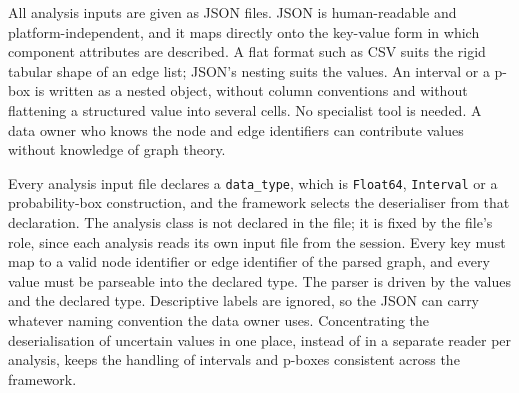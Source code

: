 \documentclass[12pt]{report}
\begin{document}
All analysis inputs are given as JSON files. JSON is human-readable and platform-independent,
and it maps directly onto the key-value form in which component attributes are described.
A flat format such as CSV suits the rigid tabular shape of an edge list; JSON's nesting suits
the values. An interval or a p-box is written as a nested object, without column conventions
and without flattening a structured value into several cells. No specialist tool is needed. A
data owner who knows the node and edge identifiers can contribute values without knowledge of
graph theory.

Every analysis input file declares a \texttt{data\_type}, which is \texttt{Float64},
\texttt{Interval} or a probability-box construction, and the framework selects the
deserialiser from that declaration. The analysis class is not declared in the file; it is
fixed by the file's role, since each analysis reads its own input file from the session.
Every key must map to a valid node identifier or edge identifier of the parsed graph, and
every value must be parseable into the declared type. The parser is driven by the values and
the declared type. Descriptive labels are ignored, so the JSON can carry whatever naming
convention the data owner uses. Concentrating the deserialisation of uncertain values in one
place, instead of in a separate reader per analysis, keeps the handling of intervals and
p-boxes consistent across the framework.
\end{document}
